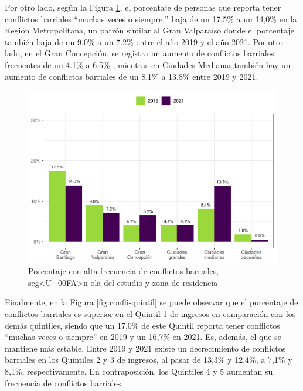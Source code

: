 \documentclass[
  12pt,
]{book}
\begin{document}
Por otro lado, según la Figura \ref{fig:confli-estrato}, el porcentaje de personas que reporta tener conflictos barriales ``muchas veces o siempre,'' baja de un 17.5\% a un 14,0\% en la Región Metropolitana, un patrón similar al Gran Valparaíso donde el porcentaje también baja de un 9.0\% a un 7.2\% entre el año 2019 y el año 2021. Por otro lado, en el Gran Concepción, se registra un aumento de conflictos barriales frecuentes de un 4.1\% a 6.5\% , mientras en Ciudades Medianas,también hay un aumento de conflictos barriales de un 8.1\% a 13.8\% entre 2019 y 2021.

\begin{figure}

{\centering \includegraphics{reporte-elsoc_files/figure-latex/confli-estrato-1} 

}

\caption{Porcentaje con alta frecuencia de conflictos barriales, seg<U+00FA>n ola del estudio y zona de residencia}\label{fig:confli-estrato}
\end{figure}

Finalmente, en la Figura \ref{fig:confli-quintil} se puede observar que el porcentaje de conflictos barriales es superior en el Quintil 1 de ingresos en comparación con los demás quintiles, siendo que un 17,0\% de este Quintil reporta tener conflictos ``muchas veces o siempre'' en 2019 y un 16,7\% en 2021. Es, además, el que se mantiene más estable. Entre 2019 y 2021 existe un decrecimiento de conflictos barriales en los Quintiles 2 y 3 de ingresos, al pasar de 13,3\% y 12,4\%, a 7,1\% y 8,1\%, respectivamente. En contraposición, los Quintiles 4 y 5 aumentan su frecuencia de conflictos barriales.
\end{document}
